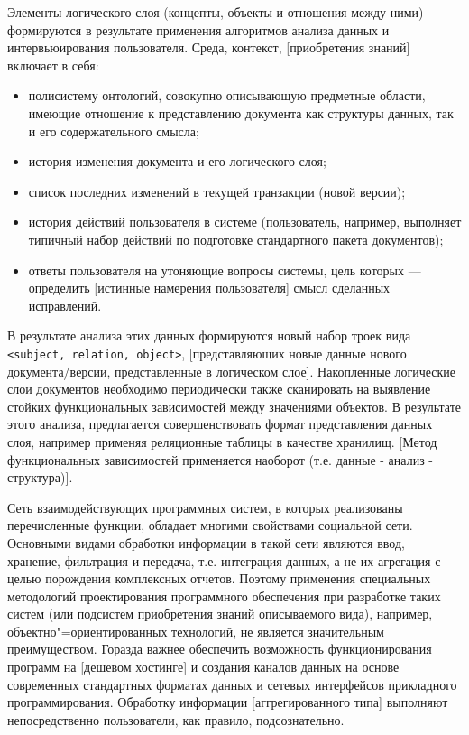 \documentclass[utf8]{../IncArticle}
\newcommand{\e}[2][fcolor]{\textcolor{pcolor}{[}\textcolor{#1}{#2}\textcolor{pcolor}{]}}
\begin{document}
Элементы логического слоя (концепты, объекты и отношения между ними)
формируются в результате применения алгоритмов анализа данных и
интервьюирования пользователя.  Среда, контекст, \e{приобретения знаний}
включает в себя:
\begin{itemize}
\item полисистему онтологий, совокупно описывающую предметные области,
  имеющие отношение к представлению документа как структуры данных,
  так и его содержательного смысла;
\item история изменения документа и его логического слоя;
\item список последних изменений в текущей транзакции (новой версии);
\item история действий пользователя в системе (пользователь, например,
  выполняет типичный набор действий по подготовке стандартного пакета документов);
\item ответы пользователя на утоняющие вопросы системы, цель которых
  --- определить \e{истинные намерения пользователя} смысл сделанных исправлений.
\end{itemize}

В результате анализа этих данных формируются новый набор троек вида
\texttt{<subject, relation, object>}, \e{представляющих новые данные
нового документа/версии, представленные в логическом
слое}.  Накопленные логические слои документов необходимо периодически
также сканировать на выявление стойких функциональных зависимостей
между значениями объектов.  В результате этого анализа, предлагается
совершенствовать формат представления данных слоя, например применяя
реляционные таблицы в качестве хранилищ.  \e{Метод функциональных
зависимостей применяется наоборот (т.е. данные - анализ - структура)}.

Сеть взаимодействующих программных систем, в которых реализованы
перечисленные функции, обладает многими свойствами социальной
сети.  Основными видами обработки информации в такой сети являются
ввод, хранение, фильтрация и передача, т.е. интеграция данных, а не их
агрегация с целью порождения комплексных отчетов.  Поэтому применения
специальных методологий проектирования программного обеспечения при
разработке таких систем (или подсистем приобретения знаний
описываемого вида), например, объектно"=ориентированных технологий, не
является значительным преимуществом.  Горазда важнее обеспечить
возможность функционирования программ на \e{дешевом хостинге} и
создания каналов данных на основе современных стандартных форматах
данных и сетевых интерфейсов прикладного программирования.  Обработку
информации \e{аггрегированного типа} выполняют непосредственно
пользователи, как правило, подсознательно.
\end{document}
